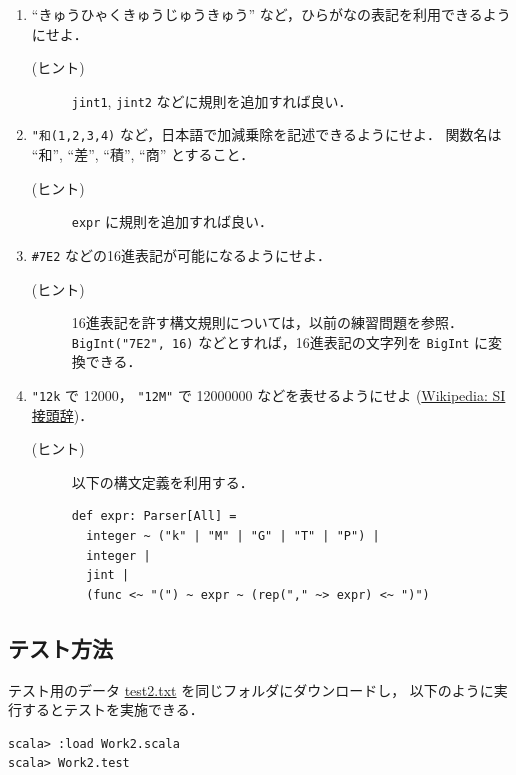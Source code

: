 \documentclass[a4j]{jsarticle}
\begin{document}
\begin{enumerate}
\item ``きゅうひゃくきゅうじゅうきゅう'' など，ひらがなの表記を利用できるようにせよ．
\begin{description}
\item[(ヒント)] \texttt{jint1}, \texttt{jint2} などに規則を追加すれば良い．
\end{description}
\item \texttt{"和(1,2,3,4)} など，日本語で加減乗除を記述できるようにせよ．
   関数名は ``和'', ``差'', ``積'', ``商'' とすること．
\begin{description}
\item[(ヒント)] \texttt{expr} に規則を追加すれば良い．
\end{description}
\item \texttt{\#7E2} などの16進表記が可能になるようにせよ．
\begin{description}
\item[(ヒント)] 16進表記を許す構文規則については，以前の練習問題を参照．
     \texttt{BigInt("7E2", 16)} などとすれば，16進表記の文字列を \texttt{BigInt} に変換できる．
\end{description}
\item \texttt{"12k} で 12000， \texttt{"12M"} で 12000000 などを表せるようにせよ (\href{https://ja.wikipedia.org/wiki/SI%E6%8E%A5%E9%A0%AD%E8%BE%9E}{Wikipedia: SI接頭辞})．
\begin{description}
\item[(ヒント)] 以下の構文定義を利用する．

\begin{verbatim}
def expr: Parser[All] =
  integer ~ ("k" | "M" | "G" | "T" | "P") |
  integer |
  jint |
  (func <~ "(") ~ expr ~ (rep("," ~> expr) <~ ")")
\end{verbatim}
\end{description}
\end{enumerate}
\subsection{テスト方法}
\label{sec-7-1}

テスト用のデータ \href{file:///home/tamura/lect2/ProLang/2018/org/prog/parser/test2.txt}{test2.txt} を同じフォルダにダウンロードし，
以下のように実行するとテストを実施できる．


\begin{verbatim}
scala> :load Work2.scala
scala> Work2.test
\end{verbatim}
\end{document}
